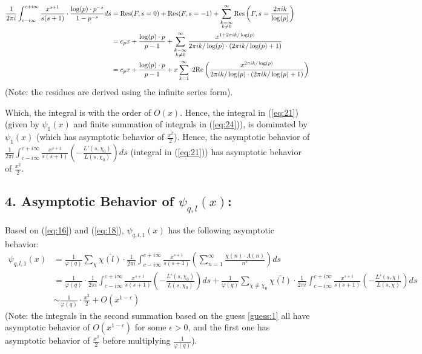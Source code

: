 \documentclass{article}
\newcommand{\Real}{\textmd{Re}}
\newcommand{\Res}{\textmd{Res}}
\begin{document}
\begin{equation}
    \label{eq:24}
    \begin{split}
        \frac{1}{2\pi i}\int_{c-i\infty}^{c+i\infty}\frac{x^{s+1}}{s(s+1)}\cdot \frac{\log(p)\cdot p^{-s}}{1-p^{-s}}ds &= \Res(F,s=0)+\Res(F,s=-1)+\sum_{\substack{k=\infty\\k\neq 0}}^{\infty}\Res\left(F,s=\frac{2\pi ik}{\log(p)}\right)\\
        &= c_px + \frac{\log(p)\cdot p}{p-1} + \sum_{\substack{k-\infty\\k\neq 0}}^{\infty}\frac{x^{1+2\pi ik/\log(p)}}{2\pi ik/\log(p)\cdot (2\pi ik/\log(p)+1)}\\
        &= c_px+\frac{\log(p)\cdot p}{p-1}+x\sum_{k=1}^{\infty}\cdot 2\Real\left(\frac{x^{2\pi ik/\log(p)}}{2\pi ik/\log(p)\cdot (2\pi ik/\log(p)+1)}\right)
    \end{split}
\end{equation}
(Note: the residues are derived using the infinite series form).

Which, the integral is with the order of $O(x)$. Hence, the integral in (\ref{eq:21}) (given by $\psi_1(x)$ and finite summation of integrals in (\ref{eq:24})), is dominated by $\psi_1(x)$ (which has asymptotic behavior of $\frac{x^2}{2}$). Hence, the asymptotic behavior of $\frac{1}{2\pi i}\int_{c-i\infty}^{c+i\infty}\frac{x^{s+1}}{s(s+1)}\left(-\frac{L'(s,\chi_0)}{L(s,\chi_0)}\right)ds$ (integral in (\ref{eq:21})) has asymptotic behavior of $\frac{x^2}{2}$.

\subsection*{4. Asymptotic Behavior of $\psi_{q,l}(x)$:}
Based on (\ref{eq:16}) and (\ref{eq:18}), $\psi_{q,l,1}(x)$ has the following asymptotic behavior:
\begin{equation}
    \label{eq:25}
    \begin{split}
        \psi_{q,l,1}(x)&=\frac{1}{\varphi(q)}\sum_{\chi}\overline{\chi(l)}\cdot\frac{1}{2\pi i}\int_{c-i\infty}^{c+i\infty}\frac{x^{s+1}}{s(s+1)}\left(\sum_{n=1}^{\infty}\frac{\chi(n)\cdot\Lambda(n)}{n^s}\right)ds\\
        &= \frac{1}{\varphi(q)}\cdot\frac{1}{2\pi i}\int_{c-i\infty}^{c+i\infty}\frac{x^{s+1}}{s(s+1)}\left(-\frac{L'(s,\chi_0)}{L(s,\chi_0)}\right)ds + \frac{1}{\varphi(q)}\sum_{\chi\neq \chi_0}\overline{\chi(l)}\cdot\frac{1}{2\pi i}\int_{c-i\infty}^{c+i\infty}\frac{x^{s+1}}{s(s+1)}\left(-\frac{L'(s,\chi)}{L(s,\chi)}\right)ds\\
        &\sim \frac{1}{\varphi(q)}\cdot \frac{x^2}{2}+O(x^{1-\epsilon})
    \end{split}
\end{equation}
(Note: the integrals in the second summation based on the guess \ref{guess:1} all have asymptotic behavior of $O(x^{1-\epsilon})$ for some $\epsilon>0$, and the first one has asymptotic behavior of $\frac{x^2}{2}$ before multiplying $\frac{1}{\varphi(q)}$).
\end{document}
